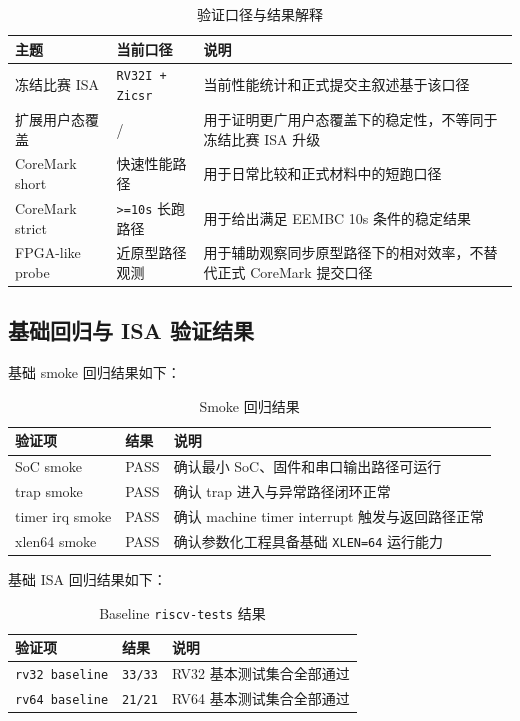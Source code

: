 \begin{table}[H]
    \centering
    \small
    \caption{验证口径与结果解释}
    \begin{tabularx}{0.95\textwidth}{L{0.24\textwidth} L{0.23\textwidth} Y}
        \toprule
        主题 & 当前口径 & 说明 \\
        \midrule
        冻结比赛 ISA & \texttt{RV32I + Zicsr} & 当前性能统计和正式提交主叙述基于该口径 \\
        扩展用户态覆盖 &  /  & 用于证明更广用户态覆盖下的稳定性，不等同于冻结比赛 ISA 升级 \\
        CoreMark short & 快速性能路径 & 用于日常比较和正式材料中的短跑口径 \\
        CoreMark strict & \texttt{>=10s} 长跑路径 & 用于给出满足 EEMBC 10s 条件的稳定结果 \\
        FPGA-like probe & 近原型路径观测 & 用于辅助观察同步原型路径下的相对效率，不替代正式 CoreMark 提交口径 \\
        \bottomrule
    \end{tabularx}
\end{table}

\subsection{基础回归与 ISA 验证结果}

基础 smoke 回归结果如下：
\begin{table}[H]
    \centering
    \small
    \caption{Smoke 回归结果}
    \begin{tabularx}{0.92\textwidth}{L{0.30\textwidth} L{0.16\textwidth} Y}
        \toprule
        验证项 & 结果 & 说明 \\
        \midrule
        SoC smoke & PASS & 确认最小 SoC、固件和串口输出路径可运行 \\
        trap smoke & PASS & 确认 trap 进入与异常路径闭环正常 \\
        timer irq smoke & PASS & 确认 machine timer interrupt 触发与返回路径正常 \\
        xlen64 smoke & PASS & 确认参数化工程具备基础 \texttt{XLEN=64} 运行能力 \\
        \bottomrule
    \end{tabularx}
\end{table}

基础 ISA 回归结果如下：
\begin{table}[H]
    \centering
    \small
    \caption{Baseline \texttt{riscv-tests} 结果}
    \begin{tabularx}{0.92\textwidth}{L{0.32\textwidth} L{0.18\textwidth} Y}
        \toprule
        验证项 & 结果 & 说明 \\
        \midrule
        \texttt{rv32 baseline} & \texttt{33/33} & RV32 基本测试集合全部通过 \\
        \texttt{rv64 baseline} & \texttt{21/21} & RV64 基本测试集合全部通过 \\
        \bottomrule
    \end{tabularx}
\end{table}

